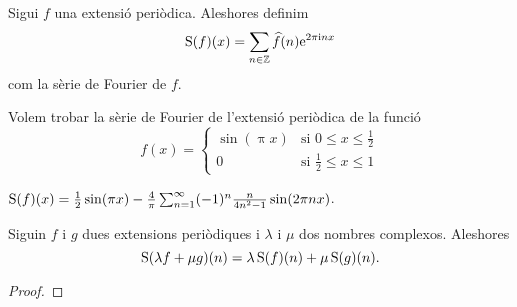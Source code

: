 \documentclass[../Apunts.tex]{subfiles}
\begin{document}
	\begin{definition}
		\label{def:sèrie de Fourier}
		Sigui \(f\) una extensió periòdica. Aleshores definim
		\[\operatorname{S}(f)(x)=\sum_{n\in\mathbb{Z}}\widehat{f}(n)\mathrm{e}^{2\pi\mathrm{i} nx}\]
		com la sèrie de Fourier de \(f\).
	\end{definition}
	\begin{example}
		\label{ex:trobar una sèrie de Fourier}
		Volem trobar la sèrie de Fourier de l'extensió periòdica de la funció
		\[f(x)=\begin{cases}
			\sin(\uppi x) & \text{si } 0\leq x\leq\frac{1}{2} \\
			0 & \text{si }\frac{1}{2}\leq x\leq 1
		\end{cases}\]
		\begin{solution}
			\(\operatorname{S}(f)(x)=\frac{1}{2}\sin(\pi x)-\frac{4}{\pi}\sum_{n=1}^{\infty}(-1)^{n}\frac{n}{4n^{2}-1}\sin(2\pi nx)\).
		\end{solution}
	\end{example}
	\begin{proposition}
		\label{prop:les sèries de Fourier són lineals}
		Siguin \(f\) i \(g\) dues extensions periòdiques i \(\lambda\) i \(\mu\) dos nombres complexos. Aleshores
		\[\operatorname{S}(\lambda f+\mu g)(n)=\lambda\operatorname{S}(f)(n)+\mu\operatorname{S}(g)(n).\]
		\begin{proof}
		\end{proof}
	\end{proposition}
\end{document}
